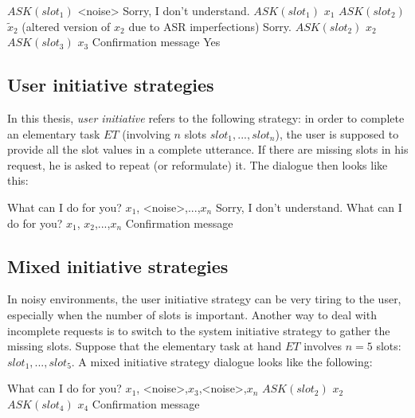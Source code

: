 		\begin{dialogue}
			 $ASK(slot_1)$
                         <noise>
			 Sorry, I don't understand. $ASK(slot_1)$
			 $x_1$
			 $ASK(slot_2)$
                         $\tilde{x}_2$ (altered version of $x_2$ due to ASR imperfections)
                         Sorry. $ASK(slot_2)$
                         $x_2$
			 $ASK(slot_3)$
			 $x_3$
			 Confirmation message
                         Yes
		\end{dialogue}
	
	\subsection{User initiative strategies}
	
		In this thesis, \textit{user initiative} refers to the following strategy: in order to complete an elementary task $ET$ (involving $n$ slots $slot_1,...,slot_n$), the user is supposed to provide all the slot values in a complete utterance. If there are missing slots in his request, he is asked to repeat (or reformulate) it. The dialogue then looks like this:
		
		\begin{dialogue}
			 What can I do for you?
			 $x_1$, <noise>,...,$x_n$
			 Sorry, I don't understand. What can I do for you?
			 $x_1$, $x_2$,...,$x_n$
			 Confirmation message
		\end{dialogue}
	
	\subsection{Mixed initiative strategies}
	
		In noisy environments, the user initiative strategy can be very tiring to the user, especially when the number of slots is important. Another way to deal with incomplete requests is to switch to the system initiative strategy to gather the missing slots. Suppose that the elementary task at hand $ET$ involves $n=5$ slots: $slot_1,...,slot_5$. A mixed initiative strategy dialogue looks like the following:
		
		\begin{dialogue}
			 What can I do for you?
			 $x_1$, <noise>,$x_3$,<noise>,$x_n$
			 $ASK(slot_2)$
			\speak{USER} $x_2$
			 $ASK(slot_4)$
			\speak{USER} $x_4$
			 Confirmation message
		\end{dialogue}

